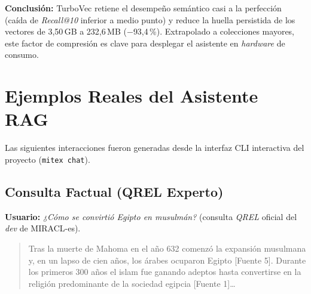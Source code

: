 \documentclass[11pt,a4paper]{article}
\newcommand{\code}[1]{\texttt{#1}}
\begin{document}
\begin{center}
\end{center}

\textbf{Conclusión:} TurboVec retiene el desempeño semántico casi a la perfección (caída de \textit{Recall@10} inferior a medio punto) y reduce la huella persistida de los vectores de 3,50\,GB a 232,6\,MB ($-$93,4\,\%). Extrapolado a colecciones mayores, este factor de compresión es clave para desplegar el asistente en \textit{hardware} de consumo.

\FloatBarrier

\section{Ejemplos Reales del Asistente RAG}

Las siguientes interacciones fueron generadas desde la interfaz CLI interactiva del proyecto (\code{mitex chat}).

\subsection{Consulta Factual (QREL Experto)}

\textbf{Usuario:} \textit{¿Cómo se convirtió Egipto en musulmán?} (consulta \textit{QREL} oficial del \textit{dev} de MIRACL-es).

\begin{quote}
Tras la muerte de Mahoma en el año 632 comenzó la expansión musulmana y, en un lapso de cien años, los árabes ocuparon Egipto [Fuente 5]. Durante los primeros 300 años el islam fue ganando adeptos hasta convertirse en la religión predominante de la sociedad egipcia [Fuente 1]\ldots
\end{quote}
\end{document}
